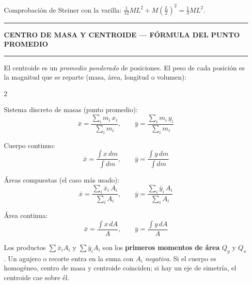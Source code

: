 \documentclass[10pt,a4paper]{article}
\newcommand{\seccion}[1]{%
  \vspace{2mm}\hrule\vspace{1mm}%
  \textbf{\footnotesize\MakeUppercase{#1}}\vspace{1mm}\hrule\vspace{2mm}}
\newcommand{\bx}{\bar{x}}
\newcommand{\by}{\bar{y}}
\begin{document}
\vspace{1mm}
Comprobación de Steiner con la varilla:
$\frac{1}{12}ML^{2} + M\!\left(\frac{L}{2}\right)^{\!2} = \frac{1}{3}ML^{2}$.

\seccion{Centro de masa y centroide — fórmula del punto promedio}

El centroide es un \emph{promedio ponderado} de posiciones. El peso de cada
posición es la magnitud que se reparte (masa, área, longitud o volumen):

\begin{multicols}{2}

Sistema discreto de masas (punto promedio):
\begin{equation*}
  \bx = \frac{\displaystyle\sum_i m_i\,x_i}{\displaystyle\sum_i m_i},
  \qquad
  \by = \frac{\displaystyle\sum_i m_i\,y_i}{\displaystyle\sum_i m_i}
\end{equation*}

Cuerpo continuo:
\begin{equation*}
  \bx = \frac{\displaystyle\int x\,dm}{\displaystyle\int dm},
  \qquad
  \by = \frac{\displaystyle\int y\,dm}{\displaystyle\int dm}
\end{equation*}

\columnbreak

Áreas compuestas (el caso más usado):
\begin{equation*}
  \bx = \frac{\displaystyle\sum_i \bx_i\,A_i}{\displaystyle\sum_i A_i},
  \qquad
  \by = \frac{\displaystyle\sum_i \by_i\,A_i}{\displaystyle\sum_i A_i}
\end{equation*}

Área continua:
\begin{equation*}
  \bx = \frac{\displaystyle\int x\,dA}{A},
  \qquad
  \by = \frac{\displaystyle\int y\,dA}{A}
\end{equation*}

\end{multicols}

Los productos $\sum \bx_i A_i$ y $\sum \by_i A_i$ son los \textbf{primeros momentos
de área} $Q_y$ y $Q_x$. Un agujero o recorte entra en la suma con $A_i$
\emph{negativa}. Si el cuerpo es homogéneo, centro de masa y centroide coinciden;
si hay un eje de simetría, el centroide cae sobre él.
\end{document}
